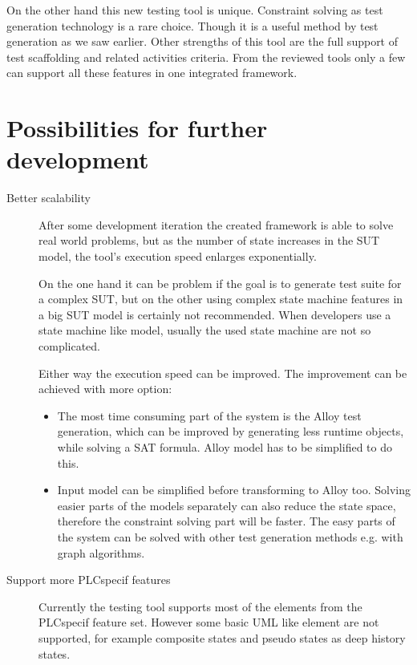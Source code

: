 On the other hand this new testing tool is unique. Constraint solving as test generation technology is a rare choice. Though it is a useful method by test generation as we saw earlier. Other strengths of this tool are the full support of test scaffolding and related activities criteria. From the reviewed tools only a few can support all these features in one integrated framework. 


\section{Possibilities for further development}
\label{sec:furtherdevelopment}

\begin{description}
	\item[Better scalability] After some development iteration the created framework is able to solve real world problems, but as the number of state increases in the SUT model, the tool's execution speed enlarges exponentially.
	
	On the one hand it can be problem if the goal is to generate test suite for a complex SUT, but on the other using complex state machine features in a big SUT model is certainly not recommended. When developers use a state machine like model, usually the used state machine are not so complicated.
	
	Either way the execution speed can be improved. The improvement can be achieved with more option:
	
	\begin{itemize}
		\item The most time consuming part of the system is the Alloy test generation, which can be improved by generating less runtime objects, while solving a SAT formula. Alloy model has to be simplified to do this.
		\item Input model can be simplified before transforming to Alloy too. Solving easier parts of the models separately can also reduce the state space, therefore the constraint solving part will be faster. The easy parts of the system can be solved with other test generation methods e.g. with graph algorithms.
	\end{itemize}
	\item[Support more PLCspecif features] Currently the testing tool supports most of the elements from the PLCspecif feature set. However some basic UML like element are not supported, for example composite states and pseudo states as deep history states.
	

\end{description}
